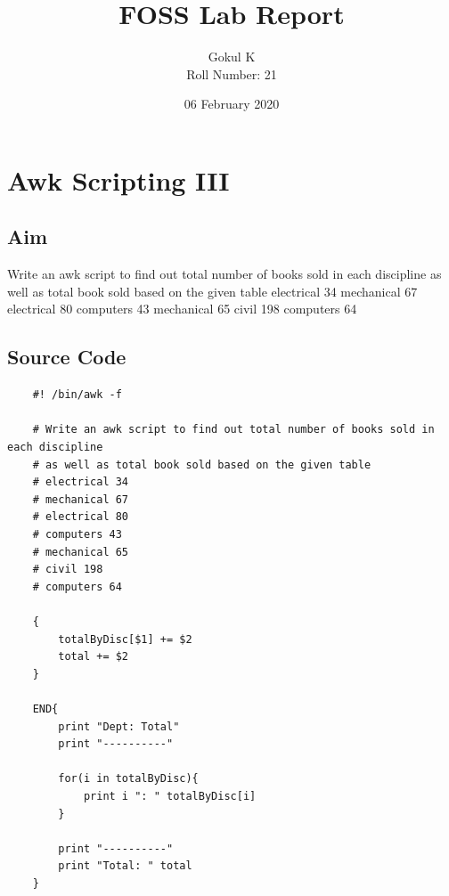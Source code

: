 \documentclass{article}
\begin{document}
\title{FOSS Lab Report}
\author{Gokul K\\[2\baselineskip]
Roll Number: 21\\[2\baselineskip]}
\date{06 February 2020}

\maketitle

\setcounter{section}{17}
\section{Awk Scripting III}
\subsection{Aim}

Write an awk script to find out total number of books sold in each discipline
 as well as total book sold based on the given table\newline
electrical 34\newline
mechanical 67\newline
electrical 80\newline
computers 43\newline
mechanical 65\newline
civil 198\newline
computers 64\newline

\subsection{Source Code}
\begin{verbatim}
    #! /bin/awk -f

    # Write an awk script to find out total number of books sold in each discipline
    # as well as total book sold based on the given table
    # electrical 34
    # mechanical 67
    # electrical 80
    # computers 43
    # mechanical 65
    # civil 198
    # computers 64
    
    {
        totalByDisc[$1] += $2
        total += $2
    }
    
    END{
        print "Dept: Total"
        print "----------"
    
        for(i in totalByDisc){
            print i ": " totalByDisc[i]
        }
    
        print "----------"
        print "Total: " total
    }
\end{verbatim}
\end{document}
